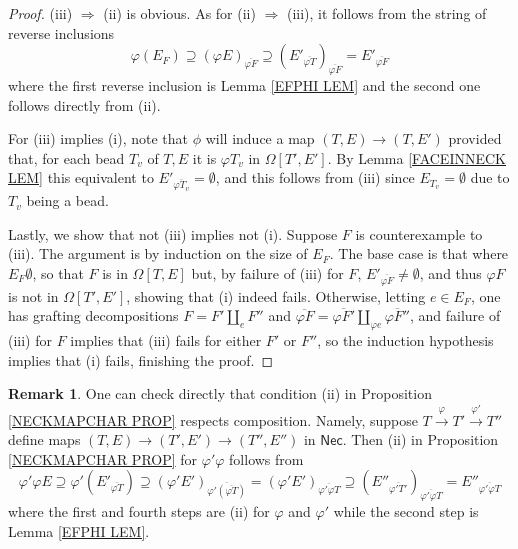 \documentclass[a4paper,10pt
,draft
]{article}%
\numberwithin{equation}{section}
\numberwithin{figure}{section}
\theoremstyle{definition} %
\newtheorem{remark}[equation]{Remark}%
\newcommand{\1}{\ensuremath{\mathbbm 1}}%
\begin{document}
\begin{proof}
(iii) $\Rightarrow$ (ii) is obvious.
As for (ii) $\Rightarrow$ (iii),
it follows from the 
string of reverse inclusions
\[
\varphi(E_F)
	\supseteq
\left(\varphi E\right)_{\overline{\varphi F}}
	\supseteq
\left(E'_{\overline{\varphi T}}\right)_{\overline{\varphi F}}
	=
E'_{\overline{\varphi F}}
\]
where the first reverse inclusion is Lemma \ref{EFPHI LEM}
and the second one follows directly from (ii).


For (iii) implies (i), 
note that $\phi$ will induce a map 
$(T,E) \to (T,E')$
provided that, for each bead $T_v$ of $T,E$
it is $\varphi T_v$ in 
$\Omega[T',E']$.
By Lemma \ref{FACEINNECK LEM}
this equivalent to
$E'_{\overline{\varphi T_v}} = \emptyset$,
and this follows from (iii)
since $E_{T_v} = \emptyset$
due to $T_v$ being a bead.

Lastly, we show that not (iii) implies not (i).
Suppose $F$ is counterexample to (iii).
The argument is by induction on the size of $E_F$.
The base case is that where $E_F \emptyset$, 
so that $F$ is in 
$\Omega[T,E]$ but, by failure of (iii) for $F$,
$E'_{\overline{\varphi F}} \neq \emptyset$,
and thus $\varphi F$ is not in 
$\Omega[T',E']$,
showing that (i) indeed fails.
Otherwise, letting $e \in E_F$, one has grafting decompositions
$F = F' \amalg_e F''$
and 
$\overline{\varphi F} = 
\overline{\varphi F'}
\amalg_{\varphi e}
\overline{\varphi F''}$,
and failure of (iii) for $F$
implies that (iii) fails for either $F'$ or $F''$,
so the induction hypothesis implies that (i) fails, finishing the proof.
\end{proof}



\begin{remark}
One can check directly that 
condition (ii) in Proposition \ref{NECKMAPCHAR PROP}
respects composition.
Namely, suppose $T \xrightarrow{\varphi} T' \xrightarrow{\varphi'} T''$
define maps
$(T,E) \to (T',E') \to (T'',E'')$
in $\mathsf{Nec}$.
Then (ii) in Proposition \ref{NECKMAPCHAR PROP}
for $\varphi' \varphi$
follows from  
\[
\varphi' \varphi E
	\supseteq
\varphi'
\left(E'_{\overline{\varphi T}}\right)
	\supseteq
\left(\varphi' E'\right)_
{\overline{\varphi' (\overline{\varphi T})}}
	=
\left(\varphi' E'\right)_
{\overline{\varphi' \varphi T}}
	\supseteq
\left(
E''_{\overline{\varphi' T'}}\right)_
{\overline{\varphi' \varphi T}}
	=
E''_{\overline{\varphi' \varphi T}}
\]
where the first and fourth steps are 
(ii) for $\varphi$ and $\varphi'$
while the second step is Lemma \ref{EFPHI LEM}.
\end{remark}
\end{document}
